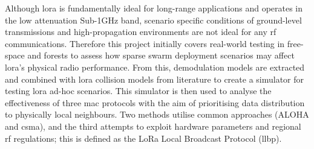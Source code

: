 Although \ac{lora} is fundamentally ideal for long-range applications and operates in the low attenuation Sub-1GHz band, scenario specific conditions of ground-level transmissions and high-propagation environments are not ideal for any \ac{rf} communications. Therefore this project initially covers real-world testing in free-space and forests to assess how sparse swarm deployment scenarios may affect \ac{lora}'s physical radio performance. From this, demodulation models are extracted and combined with \ac{lora} collision models from literature to create a simulator for testing \ac{lora} ad-hoc scenarios. This simulator is then used to analyse the effectiveness of three \ac{mac} protocols with the aim of prioritising data distribution to physically local neighbours. Two methods utilise common approaches (ALOHA and \ac{csma}), and the third attempts to exploit hardware parameters and regional \ac{rf} regulations; this is defined as the LoRa Local Broadcast Protocol (\ac{llbp}).





